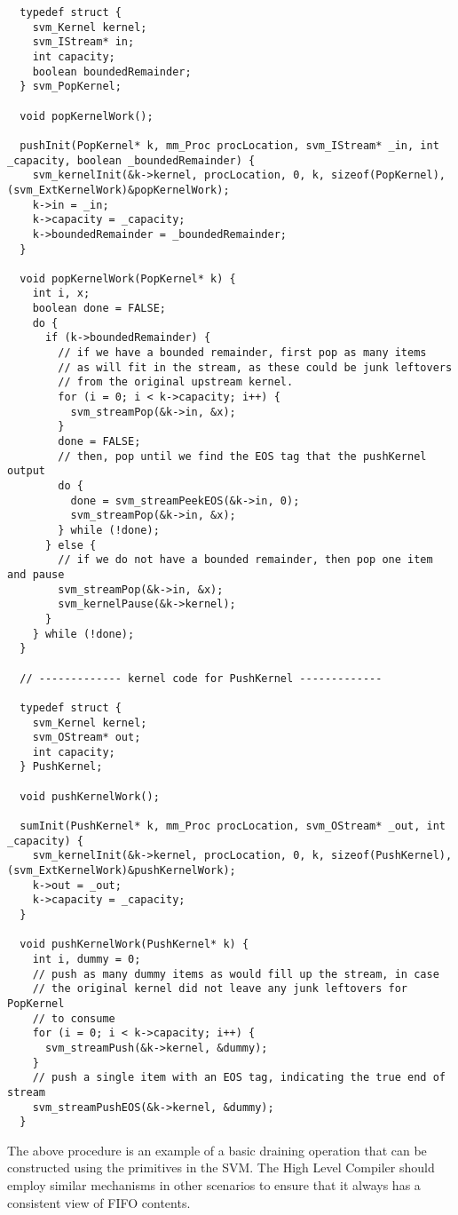 {\begin{verbatim}
  typedef struct {
    svm_Kernel kernel;
    svm_IStream* in;
    int capacity;
    boolean boundedRemainder;
  } svm_PopKernel;

  void popKernelWork();
  
  pushInit(PopKernel* k, mm_Proc procLocation, svm_IStream* _in, int _capacity, boolean _boundedRemainder) {
    svm_kernelInit(&k->kernel, procLocation, 0, k, sizeof(PopKernel), (svm_ExtKernelWork)&popKernelWork); 
    k->in = _in;
    k->capacity = _capacity;
    k->boundedRemainder = _boundedRemainder;
  }

  void popKernelWork(PopKernel* k) {
    int i, x;
    boolean done = FALSE;
    do {
      if (k->boundedRemainder) {
        // if we have a bounded remainder, first pop as many items
        // as will fit in the stream, as these could be junk leftovers 
        // from the original upstream kernel.
        for (i = 0; i < k->capacity; i++) {
          svm_streamPop(&k->in, &x);
        }
        done = FALSE;
        // then, pop until we find the EOS tag that the pushKernel output
        do {
          done = svm_streamPeekEOS(&k->in, 0);
          svm_streamPop(&k->in, &x);
        } while (!done);
      } else {
        // if we do not have a bounded remainder, then pop one item and pause
        svm_streamPop(&k->in, &x);
        svm_kernelPause(&k->kernel);
      }
    } while (!done);
  }

  // ------------- kernel code for PushKernel -------------

  typedef struct {
    svm_Kernel kernel;
    svm_OStream* out;
    int capacity;
  } PushKernel;

  void pushKernelWork();
  
  sumInit(PushKernel* k, mm_Proc procLocation, svm_OStream* _out, int _capacity) {
    svm_kernelInit(&k->kernel, procLocation, 0, k, sizeof(PushKernel), (svm_ExtKernelWork)&pushKernelWork); 
    k->out = _out;
    k->capacity = _capacity;
  }

  void pushKernelWork(PushKernel* k) {
    int i, dummy = 0;
    // push as many dummy items as would fill up the stream, in case
    // the original kernel did not leave any junk leftovers for PopKernel 
    // to consume
    for (i = 0; i < k->capacity; i++) {
      svm_streamPush(&k->kernel, &dummy);
    }
    // push a single item with an EOS tag, indicating the true end of stream
    svm_streamPushEOS(&k->kernel, &dummy);
  }
\end{verbatim}}

The above procedure is an example of a basic draining operation that
can be constructed using the primitives in the SVM.  The High Level
Compiler should employ similar mechanisms in other scenarios to ensure
that it always has a consistent view of FIFO contents.